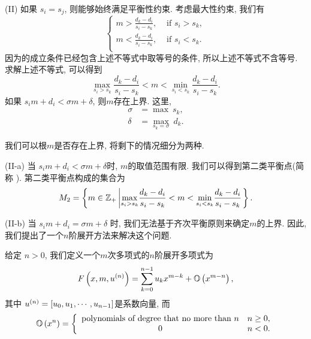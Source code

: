(II) 如果 $s_i = s_j$, 则能够始终满足平衡性约束. 考虑最大性约束, 我们有 
\begin{equation}
\left\{
\begin{split}
m > \frac{d_k-d_i}{s_i-s_k}, & \text{ if } s_i>s_k,  \\
m < \frac{d_k-d_i}{s_i-s_k}, & \text{ if } s_i<s_k.  \\
\end{split}
\right.
\end{equation}
因为\BPone{}的成立条件已经包含上述不等式中取等号的条件, 所以上述不等式不含等号. 求解上述不等式, 可以得到 
\begin{equation}
\underset{s_i>s_k}{\max}{\frac{d_k-d_i}{s_i-s_k}} < m < \underset{s_i<s_k}{\min}{\frac{d_k-d_i}{s_i-s_k}}.
\end{equation}
如果 $s_i m + d_i < \sigma m + \delta$, 则$m$存在上界. 这里, 
\begin{equation}
\begin{split}
\sigma &= \max ~s_k,  \\
\delta &= \underset{s_k=\sigma}{\max}{~d_k}.
\end{split}
\label{eq-max-sd}
\end{equation}

我们可以根$m$是否存在上界, 将剩下的情况细分为两种. 

(II-a) 当 $s_i m + d_i < \sigma m + \delta$时, $m$的取值范围有限. 我们可以得到第二类平衡点(简称 \BPtwo{}). 第二类平衡点构成的集合为
\begin{equation}
M_2=\left\{m\in \mathbb Z_+\left|\underset{s_i>s_k}{\max}{\frac{d_k-d_i}{s_i-s_k}} < m < \underset{s_i<s_k}{\min}{\frac{d_k-d_i}{s_i-s_k}}\right.\right\} .
\end{equation}

(II-b) 当 $s_i m + d_i = \sigma m + \delta$ 时, 我们无法基于齐次平衡原则来确定$m$的上界. 因此, 我们提出了一个$n$阶展开方法来解决这个问题.

给定 $n>0$, 我们定义一个$m$次多项式的$n$阶展开多项式为
\begin{equation}
F\left(x,m,u^{(n)}\right)=\sum_{k=0}^{n-1}{u_k x^{m-k}}+\mathbb O\left(x^{m-n}\right),
\label{npoly}
\end{equation}
其中 $u^{(n)}=\left[u_0,u_1,\cdots,u_{n-1}\right]$是系数向量, 而
\begin{equation}
\mathbb O\left(x^n\right)=\left\{
\begin{array}{cl}
\text{polynomials of degree that no more than } n & n\ge 0, \\
0                                                 & n<0 .
\end{array}
\right.
\end{equation}

